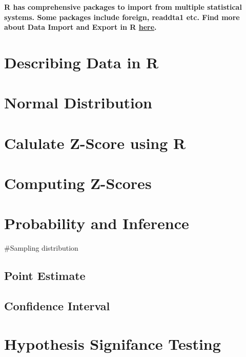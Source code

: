 \documentclass[
]{book}
\begin{document}
\textbf{R has comprehensive packages to import from multiple statistical systems. Some packages include foreign, readdta1 etc. Find more about Data Import and Export in R \href{https://cran.r-project.org/doc/manuals/r-release/R-data.html}{here}.}

\hypertarget{describing-data-in-r}{%
\chapter{Describing Data in R}\label{describing-data-in-r}}

\hypertarget{normal-distribution}{%
\chapter{Normal Distribution}\label{normal-distribution}}

\hypertarget{calulate-z-score-using-r}{%
\chapter{Calulate Z-Score using R}\label{calulate-z-score-using-r}}

\hypertarget{computing-z-scores}{%
\chapter{Computing Z-Scores}\label{computing-z-scores}}

\hypertarget{probability-and-inference}{%
\chapter{Probability and Inference}\label{probability-and-inference}}

\#Sampling distribution

\hypertarget{point-estimate}{%
\section{Point Estimate}\label{point-estimate}}

\hypertarget{confidence-interval}{%
\section{Confidence Interval}\label{confidence-interval}}

\hypertarget{hypothesis-signifance-testing}{%
\chapter{Hypothesis Signifance Testing}\label{hypothesis-signifance-testing}}
\end{document}

